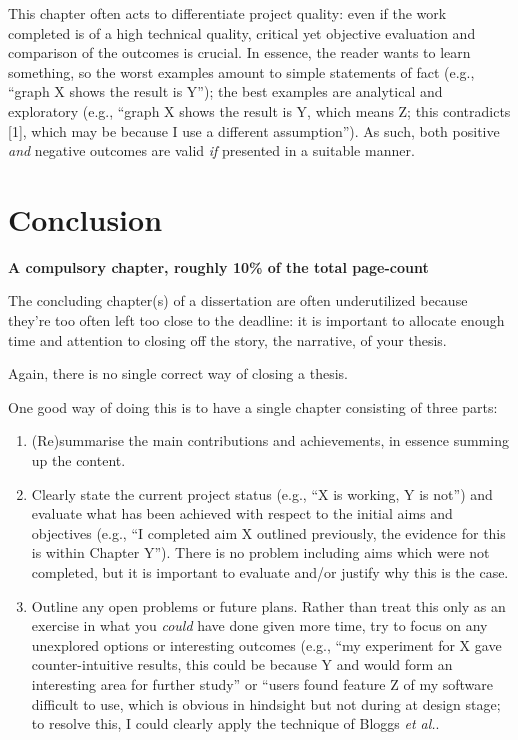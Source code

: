\documentclass[ %
                    author={Daniel Page},
                supervisor={Dr. Andrew Calway},
                    degree={MSc},
                     title={Some Structural Guidelines for Data Science MSc Theses, Including Those With Long Titles that Run Across Multiple Lines on the Front Page},
                  subtitle={And those including an optional subtitle too, for good measure},
                      type={},
                      year={2021}]{dissertation}
\begin{document}
\noindent
This chapter often acts to differentiate project quality: even if the work
completed is of a high technical quality, critical yet objective evaluation 
and comparison of the outcomes is crucial.  In essence, the reader wants to
learn something, so the worst examples amount to simple statements of fact 
(e.g., ``graph X shows the result is Y''); the best examples are analytical 
and exploratory (e.g., ``graph X shows the result is Y, which means Z; this 
contradicts [1], which may be because I use a different assumption'').  As 
such, both positive {\em and}\/ negative outcomes are valid {\em if} presented 
in a suitable manner.


\chapter{Conclusion}
\label{chap:conclusion}

{\bf A compulsory chapter,  roughly 10\% of the total page-count}
\vspace{1cm} 

\noindent
The concluding chapter(s) of a dissertation are often underutilized because they're 
too often left too close to the deadline: it is important to allocate enough time and 
attention to closing off the story, the narrative, of your thesis.

Again, there is no single correct way of closing a thesis. 

One good way of doing this is to have a single chapter consisting of three parts:

\begin{enumerate}
\item (Re)summarise the main contributions and achievements, in essence
      summing up the content.
\item Clearly state the current project status (e.g., ``X is working, Y 
      is not'') and evaluate what has been achieved with respect to the 
      initial aims and objectives (e.g., ``I completed aim X outlined 
      previously, the evidence for this is within Chapter Y'').  There 
      is no problem including aims which were not completed, but it is 
      important to evaluate and/or justify why this is the case.
\item Outline any open problems or future plans.  Rather than treat this
      only as an exercise in what you {\em could} have done given more 
      time, try to focus on any unexplored options or interesting outcomes
      (e.g., ``my experiment for X gave counter-intuitive results, this 
      could be because Y and would form an interesting area for further 
      study'' or ``users found feature Z of my software difficult to use,
      which is obvious in hindsight but not during at design stage; to 
      resolve this, I could clearly apply the technique of Bloggs {\em et al.}.
\end{enumerate}
\end{document}
